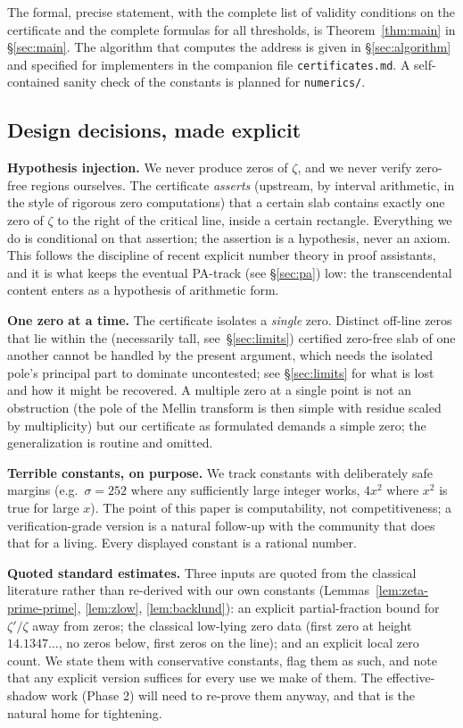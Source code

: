 \documentclass[11pt]{amsart}
\numberwithin{equation}{section}
\newcommand{\Sig}{\sigma}
\begin{document}
The formal, precise statement, with the complete list of validity
conditions on the certificate and the complete formulas for all
thresholds, is Theorem~\ref{thm:main} in \S\ref{sec:main}. The algorithm
that computes the address is given in \S\ref{sec:algorithm} and specified
for implementers in the companion file \texttt{certificates.md}. A
self-contained sanity check of the constants is planned for
\texttt{numerics/}.

\subsection{Design decisions, made explicit}\label{sec:design}

\textbf{Hypothesis injection.} We never produce zeros of $\zeta$, and we
never verify zero-free regions ourselves. The certificate \emph{asserts}
(upstream, by interval arithmetic, in the style of rigorous zero
computations) that a certain slab contains exactly one zero of $\zeta$ to
the right of the critical line, inside a certain rectangle. Everything we
do is conditional on that assertion; the assertion is a hypothesis, never
an axiom. This follows the discipline of recent explicit number theory in
proof assistants, and it is what keeps the eventual PA-track (see
\S\ref{sec:pa}) low: the transcendental content enters as a hypothesis of
arithmetic form.

\textbf{One zero at a time.} The certificate isolates a \emph{single}
zero. Distinct off-line zeros that lie within the (necessarily tall,
see~\S\ref{sec:limits}) certified zero-free slab of one another cannot be
handled by the present argument, which needs the isolated pole's
principal part to dominate uncontested; see \S\ref{sec:limits} for what is
lost and how it might be recovered. A multiple zero at a single point is
not an obstruction (the pole of the Mellin transform is then simple with
residue scaled by multiplicity) but our certificate as formulated demands
a simple zero; the generalization is routine and omitted.

\textbf{Terrible constants, on purpose.} We track constants with
deliberately safe margins (e.g.\ $\Sig = 252$ where any sufficiently large
integer works, $4x^2$ where $x^2$ is true for large $x$). The point of
this paper is computability, not competitiveness; a
verification-grade version is a natural follow-up with the community that
does that for a living. Every displayed constant is a rational number.

\textbf{Quoted standard estimates.} Three inputs are quoted from the
classical literature rather than re-derived with our own constants
(Lemmas~\ref{lem:zeta-prime-prime}, \ref{lem:zlow}, \ref{lem:backlund}):
an explicit partial-fraction bound for $\zeta'/\zeta$ away from zeros; the
classical low-lying zero data (first zero at height $14.1347\ldots$, no
zeros below, first zeros on the line); and an explicit local zero count.
We state them with conservative constants, flag them as such, and note
that any explicit version suffices for every use we make of them. The
effective-shadow work (Phase 2) will need to re-prove them anyway, and
that is the natural home for tightening.
\end{document}
